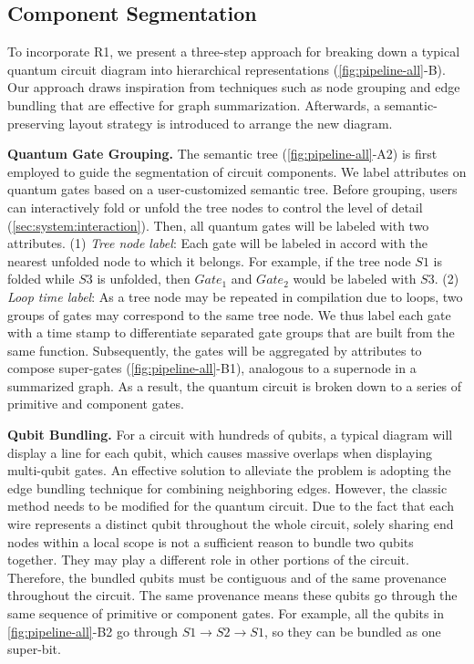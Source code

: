 \subsection{Component Segmentation}
\label{sec:segment}
To incorporate {R1}, we present a three-step approach for breaking down a typical quantum circuit diagram into hierarchical representations (\cref{fig:pipeline-all}-B).
Our approach draws inspiration from techniques such as node grouping and edge bundling that are effective for graph summarization\cite{Liu:2018:GSM}.
Afterwards, a semantic-preserving layout strategy is introduced to arrange the new diagram.

\textbf{Quantum Gate Grouping.}
The semantic tree (\cref{fig:pipeline-all}-A2) is first employed to guide the segmentation of circuit components.
We label attributes on quantum gates based on a user-customized semantic tree.
Before grouping, users can interactively fold or unfold the tree nodes to control the level of detail (\cref{sec:system:interaction}).
Then, all quantum gates will be labeled with two attributes.
(1) \emph{Tree node label}: 
Each gate will be labeled in accord with the nearest unfolded node to which it belongs.
For example, if the tree node $S1$ is folded while $S3$ is unfolded, then ${Gate}_1$ and ${Gate}_2$ would be labeled with $S3$.
(2) \emph{Loop time label}: 
As a tree node may be repeated in compilation due to loops, two groups of gates may correspond to the same tree node.
We thus label each gate with a time stamp to differentiate separated gate groups that are built from the same function.
Subsequently, the gates will be aggregated by attributes to compose super-gates (\cref{fig:pipeline-all}-B1), analogous to a supernode in a summarized graph.
As a result, the quantum circuit is broken down to a series of primitive   and component  gates.

\textbf{Qubit Bundling.}
For a circuit with hundreds of qubits, a typical diagram will display a line for each qubit, which causes massive overlaps when displaying multi-qubit gates.
An effective solution to alleviate the problem is adopting the edge bundling technique\cite{Holten:2006:HEB} for combining neighboring edges.
However, the classic method needs to be modified for the quantum circuit.
Due to the fact that each wire represents a distinct qubit throughout the whole circuit,
solely sharing end nodes within a local scope is not a sufficient reason to bundle two qubits together.
They may play a different role in other portions of the circuit.
Therefore, the bundled qubits must be contiguous and of the same provenance throughout the circuit.
The same provenance means these qubits go through the same sequence of primitive or component gates.
For example, all the qubits in \cref{fig:pipeline-all}-B2 go through $S1 \rightarrow S2 \rightarrow S1$, so they can be bundled as one super-bit.


